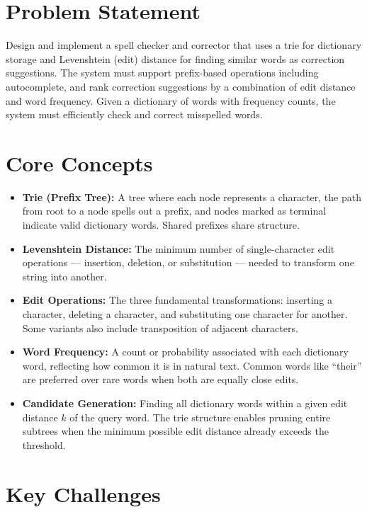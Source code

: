 \section{Problem Statement}

Design and implement a spell checker and corrector that uses a trie for dictionary storage and Levenshtein (edit) distance for finding similar words as correction suggestions. The system must support prefix-based operations including autocomplete, and rank correction suggestions by a combination of edit distance and word frequency. Given a dictionary of words with frequency counts, the system must efficiently check and correct misspelled words.

\section{Core Concepts}

\begin{itemize}
  \item \textbf{Trie (Prefix Tree):} A tree where each node represents a character, the path from root to a node spells out a prefix, and nodes marked as terminal indicate valid dictionary words. Shared prefixes share structure.
  \item \textbf{Levenshtein Distance:} The minimum number of single-character edit operations --- insertion, deletion, or substitution --- needed to transform one string into another.
  \item \textbf{Edit Operations:} The three fundamental transformations: inserting a character, deleting a character, and substituting one character for another. Some variants also include transposition of adjacent characters.
  \item \textbf{Word Frequency:} A count or probability associated with each dictionary word, reflecting how common it is in natural text. Common words like ``their'' are preferred over rare words when both are equally close edits.
  \item \textbf{Candidate Generation:} Finding all dictionary words within a given edit distance $k$ of the query word. The trie structure enables pruning entire subtrees when the minimum possible edit distance already exceeds the threshold.
\end{itemize}

\section{Key Challenges}

